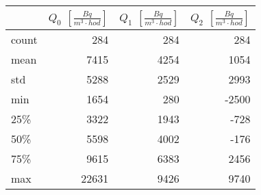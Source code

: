 \begin{tabular}{lrrr}
\toprule
{} &  $Q_0$ $\left[\si{\frac{Bq}{m^3\cdot hod}}\right]$ &  $Q_1$ $\left[\si{\frac{Bq}{m^3\cdot hod}}\right]$ &  $Q_2$ $\left[\si{\frac{Bq}{m^3\cdot hod}}\right]$ \\
\midrule
count &     284 &                                                284 &                                                284 \\
mean  &    7415 &                                               4254 &                                               1054 \\
std   &    5288 &                                               2529 &                                               2993 \\
min   &    1654 &                                                280 &                                              -2500 \\
25\%   &    3322 &                                               1943 &                                               -728 \\
50\%   &    5598 &                                               4002 &                                               -176 \\
75\%   &    9615 &                                               6383 &                                               2456 \\
max   &   22631 &                                               9426 &                                               9740 \\
\bottomrule
\end{tabular}

